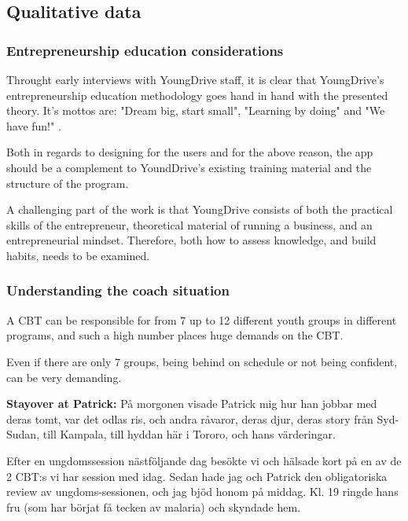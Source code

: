 \subsection{Qualitative data}

\subsubsection{Entrepreneurship education considerations}
Throught early interviews with YoungDrive staff, it is clear that YoungDrive's entrepreneurship education methodology goes hand in hand with the presented theory. It's mottos are: "Dream big, start small", "Learning by doing" and "We have fun!" \citep{youngdrive}.

Both in regards to designing for the users and for the above reason, the app should be a complement to YoundDrive's existing training material and the structure of the program.

A challenging part of the work is that YoungDrive consists of both the practical skills of the entrepreneur, theoretical material of running a business, and an entrepreneurial mindset. Therefore, both how to assess knowledge, and build habits, needs to be examined.

\subsubsection{Understanding the coach situation}

A CBT can be responsible for from 7 up to 12 different youth groups in different programs, and such a high number places huge demands on the CBT.

Even if there are only 7 groups, being behind on schedule or not being confident, can be very demanding.

\textbf{Stayover at Patrick:} På morgonen visade Patrick mig hur han jobbar med deras tomt, var det odlas ris, och andra råvaror, deras djur, deras story från Syd-Sudan, till Kampala, till hyddan här i Tororo, och hans värderingar.

Efter en ungdomssession nästföljande dag besökte vi och hälsade kort på en av de 2 CBT:s vi har session med idag. Sedan hade jag och Patrick den obligatoriska review av ungdoms-sessionen, och jag bjöd honom på middag. Kl. 19 ringde hans fru (som har börjat få tecken av malaria) och skyndade hem.

